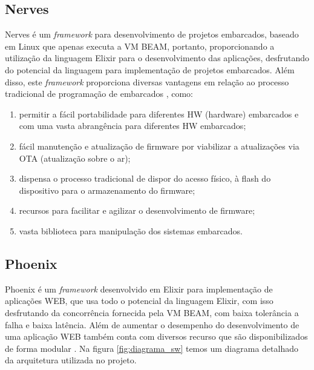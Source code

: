\documentclass[../../layout.tex]{subfiles}
\begin{document}
\subsection{Nerves}

\hspace*{3em}Nerves é um \emph{framework} para desenvolvimento de projetos embarcados, baseado em Linux que apenas executa a VM BEAM, portanto, proporcionando a utilização da linguagem Elixir para o desenvolvimento das aplicações,  desfrutando do potencial da linguagem para implementação de projetos embarcados. Além disso, este \emph{framework} proporciona diversas vantagens em relação ao processo tradicional de programação de embarcados \cite{nerves}, como:

\begin{enumerate}[label=\alph*)]
\itemsep0em
    \item permitir a fácil portabilidade para diferentes HW (hardware) embarcados e com uma vasta abrangência para diferentes HW embarcados;
    \item fácil manutenção e atualização de firmware por viabilizar a atualizações via OTA (atualização sobre o ar);
    \item dispensa o processo tradicional de dispor do acesso físico, à flash do dispositivo para o armazenamento do firmware;
    \item recursos para facilitar e agilizar o desenvolvimento de firmware;
    \item vasta biblioteca para manipulação dos sistemas embarcados.
\end{enumerate}

\subsection{Phoenix}

\hspace*{3em}Phoenix é um \emph{framework} desenvolvido em Elixir para implementação de aplicações WEB, que usa todo o potencial da linguagem Elixir, com isso desfrutando da concorrência fornecida pela VM BEAM, com baixa tolerância a falha e baixa latência.  Além de aumentar o desempenho do desenvolvimento de uma aplicação WEB também conta com diversos recurso que são disponibilizados de forma modular \cite{phoenix}. Na figura \ref{fig:diagrama_sw} temos um diagrama detalhado da arquitetura utilizada no projeto.
\end{document}
